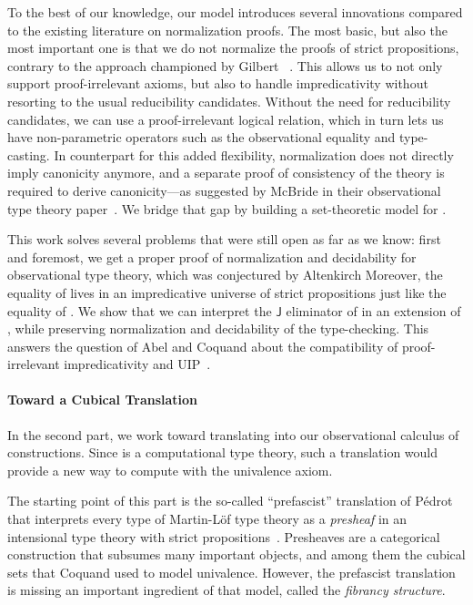 To the best of our knowledge, our model introduces several innovations compared 
to the existing literature on normalization proofs.
% 
The most basic, but also the most important one is that we do not normalize the 
proofs of strict propositions, contrary to the approach championed by 
Gilbert \etal~. 
% 
This allows us to not only support proof-irrelevant axioms, but also to handle 
impredicativity without resorting to the usual reducibility candidates.
% 
Without the need for reducibility candidates, we can use a proof-irrelevant
logical relation, which in turn lets us have non-parametric operators such
as the observational equality and type-casting.
% 
In counterpart for this added flexibility, normalization does not directly
imply canonicity anymore, and a separate proof of consistency of the
theory is required to derive canonicity---as suggested by McBride \etal in
their observational type theory paper~.
% 
We bridge that gap by building a set-theoretic model for \SetoidCC.

This work solves several problems that were still open as far as we know:
% 
% 
first and foremost, we get a proper proof of normalization and decidability for 
observational type theory, which was conjectured by Altenkirch \etal
% 
Moreover, the equality of \SetoidCC lives in an impredicative universe 
of strict propositions just like the equality of \Lean. 
% 
We show that we can interpret the \( \mathsf{J} \) eliminator of \Lean
in an extension of \SetoidCC, while preserving normalization and decidability
of the type-checking.
% 
This answers the question of Abel and Coquand about the compatibility of 
proof-irrelevant impredicativity and UIP~.

\paragraph{Toward a Cubical Translation}
% 
In the second part, we work toward translating \HoTT into our observational
calculus of constructions.
% 
Since \SetoidCC is a computational type theory, such a translation would 
provide a new way to compute with the univalence axiom.

The starting point of this part is the so-called ``prefascist'' translation of
Pédrot that interprets every type of Martin-Löf type theory as a 
\emph{presheaf} in an intensional type theory with strict 
propositions~.
% 
Presheaves are a categorical construction that subsumes many important
objects, and among them the cubical sets that Coquand \etal used to model
univalence.
% 
However, the prefascist translation is missing an important ingredient of
that model, called the \emph{fibrancy structure}.

